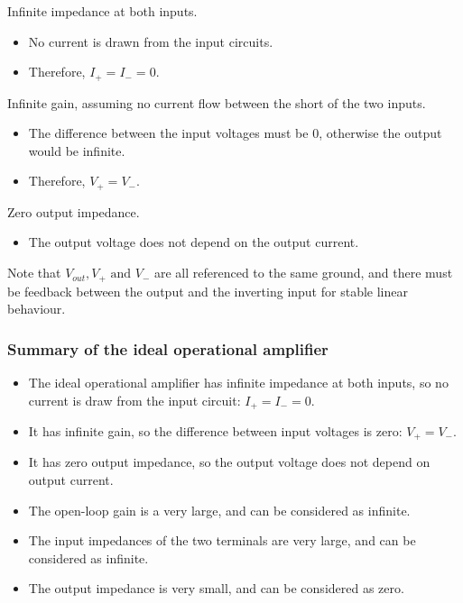 \documentclass[11pt]{article}
\begin{document}
Infinite impedance at both inputs.
\begin{itemize}
\item No current is drawn from the input circuits.
\item Therefore, \(I_+ = I_- = 0\).
\end{itemize}

Infinite gain, assuming no current flow between the short of the two inputs.
\begin{itemize}
\item The difference between the input voltages must be 0, otherwise the output would be infinite.
\item Therefore, \(V_+ = V_-\).
\end{itemize}

Zero output impedance.
\begin{itemize}
\item The output voltage does not depend on the output current.
\end{itemize}

Note that \(V_{out}, V_+ \text{ and } V_-\) are all referenced to the same ground, and there must be feedback between the output and the inverting input for stable linear behaviour.
\subsubsection{Summary of the ideal operational amplifier}
\label{sec:orgee1cde3}
\begin{itemize}
\item The ideal operational amplifier has infinite impedance at both inputs, so no current is draw from the input circuit: \(I_+ = I_- = 0\).
\item It has infinite gain, so the difference between input voltages is zero: \(V_+ = V_-\).
\item It has zero output impedance, so the output voltage does not depend on output current.
\item The open-loop gain is a very large, and can be considered as infinite.
\item The input impedances of the two terminals are very large, and can be considered as infinite.
\item The output impedance is very small, and can be considered as zero.
\end{itemize}
\end{document}
